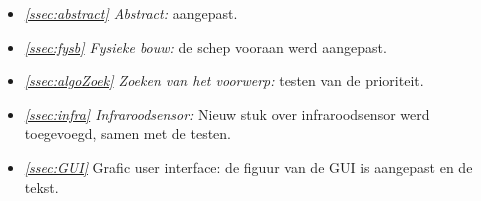 \documentclass[tt2]{penoverslag}
\begin{document}
\begin{itemize}
\item \textit{\ref{ssec:abstract} Abstract:} aangepast.
\item \textit{\ref{ssec:fysb} Fysieke bouw:} de schep vooraan werd aangepast.
\item \textit{\ref{ssec:algoZoek} Zoeken van het voorwerp:} testen van de prioriteit.
\item \textit{\ref{ssec:infra} Infraroodsensor:} Nieuw stuk over infraroodsensor werd toegevoegd, samen met de testen.
\item \textit{\ref{ssec:GUI}} Grafic user interface: de figuur van de GUI is aangepast en de tekst.


\end{itemize}



%
%
%
%
%
%
%
\end{document}
